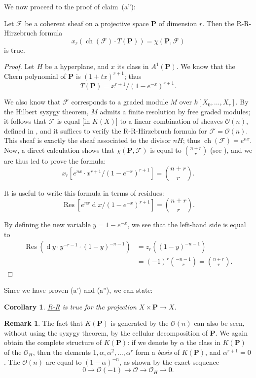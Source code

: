 \documentclass{article}
\theoremstyle{plain}
\newenvironment{proposition}[1]
    {\renewcommand\theinnerproposition{#1}\innerproposition}
    {\endinnerproposition}
\newtheorem*{corollary}{Corollary}
\theoremstyle{definition}
\newtheorem*{remark}{Remark}
\newcommand{\scr}[1]{{\mathscr{#1}}}
\newcommand{\PP}{\mathbf{P}}
\newcommand{\dd}{\operatorname{d}\!}
\DeclareMathOperator{\ch}{ch}
\newcommand{\oldpage}[1]{\marginpar{\footnotesize$\Big\vert$ \textit{p.~#1}}}
\begin{document}
We now proceed to the proof of claim~(a''):

\begin{proposition}{10}
\label{proposition10}
  Let $\scr{F}$ be a coherent sheaf on a projective space $\PP$
\oldpage{119}
  of dimension $r$.
  Then the R-R-Hirzebruch formula
  \[
    x_r(\ch(\scr{F})\cdot T(\PP)) = \chi(\PP,\scr{F})
  \]
  is true.
\end{proposition}

\begin{proof}
  Let $H$ be a hyperplane, and $x$ its class in $A^1(\PP)$.
  We know that the Chern polynomial of $\PP$ is $(1+tx)^{r+1}$;
  thus
  \[
    T(\PP) = x^{r+1}/(1-e^{-x})^{r+1}.
  \]

  We also know that $\scr{F}$ corresponds to a graded module $M$ over $k[X_0,\ldots,X_r]$.
  By the Hilbert syzygy theorem, $M$ admits a finite resolution by free graded modules;
  it follows that $\scr{F}$ is equal [in $K(X)$] to a linear combination of sheaves $\scr{O}(n)$, defined in \cite[p.~246]{12}, and it suffices to verify the R-R-Hirzebruch formula for $\scr{F}=\scr{O}(n)$.
  This sheaf is exactly the sheaf associated to the divisor $nH$;
  thus $\ch(\scr{F})=e^{nx}$.
  Now, a direct calculation shows that $\chi(\PP,\scr{F})$ is equal to $\binom{n+r}{r}$ (see \cite[p.~275]{12}), and we are thus led to prove the formula:
  \[
  \label{10equation*}
    x_r[e^{nx}\cdot x^{r+1}/(1-e^{-x})^{r+1}] = \binom{n+r}{r}.
    \tag{$\star$}
  \]

  It is useful to write this formula in terms of residues:
  \[
  \label{10equation**}
    \operatorname{Res}[e^{nx}\dd x/(1-e^{-x})^{r+1}] = \binom{n+r}{r}.
    \tag{$\star\star$}
  \]

  By defining the new variable $y=1-e^{-x}$, we see that the left-hand side is equal to
  \begin{align*}
    \operatorname{Res}(\dd y\cdot y^{-r-1}\cdot(1-y)^{-n-1})
    &= z_r((1-y)^{-n-1})
  \\&= (-1)^r\binom{-n-1}{r}
    = \binom{n+r}{r}.
  \end{align*}
\end{proof}

Since we have proven (a') and (a''), we can state:

\begin{corollary}
  \hyperref[theoremriemannroch]{R-R} is true for the projection $X\times\PP\to X$.
\end{corollary}

\begin{remark}
  The fact that $K(\PP)$ is generated by the $\scr{O}(n)$ can also be seen, without using the syzygy theorem, by the cellular decomposition of $\PP$.
  We again obtain the complete structure of $K(\PP)$:
  if we denote by $\alpha$ the class in $K(\PP)$ of the $\scr{O}_H$, then the elements $1,\alpha,\alpha^2,\ldots,\alpha^r$ form a \emph{basis} of $K(\PP)$, and $\alpha^{r+1}=0$.
  The $\scr{O}(n)$ are equal to $(1-\alpha)^{-n}$, as shown by the exact sequence
  \[
    0 \to \scr{O}(-1) \to \scr{O} \to \scr{O}_H \to 0.
  \]
\end{remark}
\end{document}
